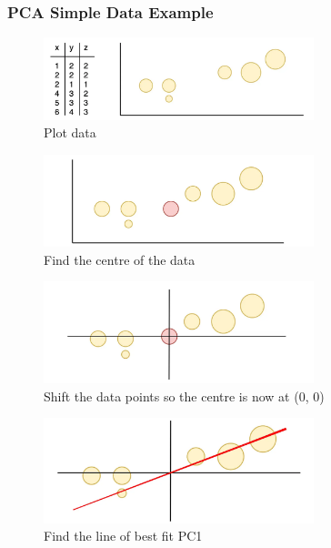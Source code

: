 \documentclass{article}
\begin{document}
\subsubsection{PCA Simple Data Example}

\begin{figure}[H]
    \centering
    \includegraphics[width=0.7\textwidth]{Img/1_MJlSXELJ6-zNJibG5CtqIg.png}
    \caption{Plot data}
\end{figure}

\begin{figure}[H]
    \centering
    \includegraphics[width=0.7\textwidth]{Img/1_1BiMkGksH0JBOEOlf1tBTg.png}
    \caption{Find the centre of the data}
\end{figure}

\begin{figure}[H]
    \centering
    \includegraphics[width=0.7\textwidth]{Img/1_m3gnAUA9dBFQlbgWAziu3A.png}
    \caption{Shift the data points so the centre is now at (0, 0)}
\end{figure}

\begin{figure}[H]
    \centering
    \includegraphics[width=0.7\textwidth]{Img/1_OjfIsQ5mxzfWoh3wtoBDBA.png}
    \caption{Find the line of best fit PC1}
\end{figure}
\end{document}
